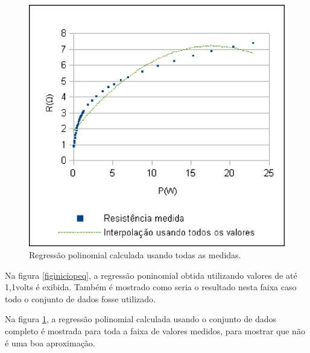 \documentclass[brazilian,12pt,a4paper,final]{article}
\begin{document}
\begin{figure}[htbp!]
  \caption{Regressão polinomial calculada usando todas as medidas.}
  \label{figiniciogr}
  \centering
    \includegraphics{iniciogr.eps}
\end{figure}

Na figura \ref{figiniciopeq}, a regressão poninomial obtida utilizando 
valores de até 1,1volts é exibida.
Também é 
mostrado como seria o resultado nesta faixa caso todo o conjunto de dados fosse utilizado.

Na figura \ref{figiniciogr}, a regressão polinomial calculada usando o
 conjunto de dados completo é mostrada para toda a faixa de valores medidos, para
mostrar que não é uma boa aproximação.
\end{document}
